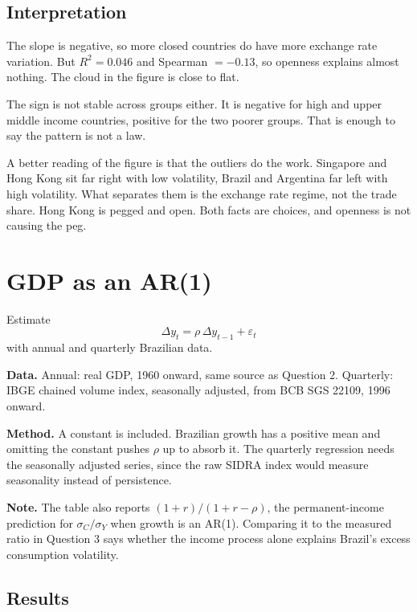 \documentclass[11pt,a4paper]{article}
\newcommand{\note}[2]{\smallskip\noindent\textbf{#1.} #2\par}
\begin{document}
\subsection*{Interpretation}

The slope is negative, so more closed countries do have more exchange rate
variation. But $R^2 = 0.046$ and Spearman $= -0.13$, so openness explains
almost nothing. The cloud in the figure is close to flat.

The sign is not stable across groups either. It is negative for high and upper
middle income countries, positive for the two poorer groups. That is enough to
say the pattern is not a law.

A better reading of the figure is that the outliers do the work. Singapore and
Hong Kong sit far right with low volatility, Brazil and Argentina far left with
high volatility. What separates them is the exchange rate regime, not the trade
share. Hong Kong is pegged and open. Both facts are choices, and openness is
not causing the peg.


\section{GDP as an AR(1)}

\begin{question}
Estimate
\[ \Delta y_t = \rho\, \Delta y_{t-1} + \varepsilon_t \]
with annual and quarterly Brazilian data.
\end{question}

\note{Data}{Annual: real GDP, 1960 onward, same source as Question 2.
Quarterly: IBGE chained volume index, seasonally adjusted, from BCB SGS 22109,
1996 onward.}

\note{Method}{A constant is included. Brazilian growth has a positive mean and
omitting the constant pushes $\rho$ up to absorb it. The quarterly regression
needs the seasonally adjusted series, since the raw SIDRA index would measure
seasonality instead of persistence.}

\note{Note}{The table also reports $(1+r)/(1+r-\rho)$, the permanent-income
prediction for $\sigma_C/\sigma_Y$ when growth is an AR(1). Comparing it to the
measured ratio in Question 3 says whether the income process alone explains
Brazil's excess consumption volatility.}

\subsection*{Results}
\end{document}
